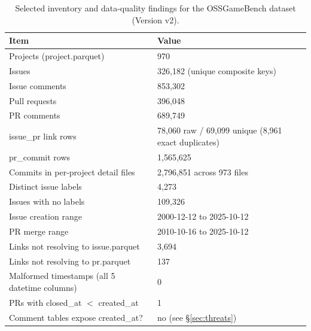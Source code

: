 \begin{table}[t]
\centering
\caption{Selected inventory and data-quality findings for the OSSGameBench dataset (Version v2).\label{tab:inventory}}
\small \begin{tabular}{@{}ll@{}}
\toprule
Item & Value \\\midrule
Projects (project.parquet) & 970 \\
Issues & 326,182 (unique composite keys) \\
Issue comments & 853,302 \\
Pull requests & 396,048 \\
PR comments & 689,749 \\
issue\_pr link rows & 78,060 raw / 69,099 unique (8,961 exact duplicates) \\
pr\_commit rows & 1,565,625 \\
Commits in per-project detail files & 2,796,851 across 973 files \\
Distinct issue labels & 4,273 \\
Issues with no labels & 109,326 \\
Issue creation range & 2000-12-12 to 2025-10-12 \\
PR merge range & 2010-10-16 to 2025-10-12 \\
Links not resolving to issue.parquet & 3,694 \\
Links not resolving to pr.parquet & 137 \\
Malformed timestamps (all 5 datetime columns) & 0 \\
PRs with closed\_at $<$ created\_at & 1 \\
Comment tables expose created\_at? & no (see \S\ref{sec:threats}) \\
\bottomrule
\end{tabular}
\end{table}
